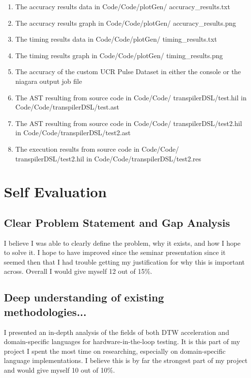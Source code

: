 \documentclass[sigconf,authordraft]{acmart}
\begin{document}
\begin{enumerate}
  \item The accuracy results data in Code/Code/plotGen/ accuracy\_results.txt
  \item The accuracy results graph in Code/Code/plotGen/ accuracy\_results.png
  \item The timing results data in Code/Code/plotGen/ timing\_results.txt
  \item The timing results graph in Code/Code/plotGen/ timing\_results.png
  \item The accuracy of the custom UCR Pulse Dataset in either the console or the niagara output job file
  \item The AST resulting from source code in Code/Code/ transpilerDSL/test.hil in Code/Code/transpilerDSL/test.ast
  \item The AST resulting from source code in Code/Code/ transpilerDSL/test2.hil in Code/Code/transpilerDSL/test2.ast
  \item The execution results from source code in Code/Code/ transpilerDSL/test2.hil in Code/Code/transpilerDSL/test2.res
\end{enumerate}

\section{Self Evaluation}

\subsection{Clear Problem Statement and Gap Analysis}
I believe I was able to clearly define the problem, why it exists, and how I hope to solve it. I hope to have improved since the seminar presentation since it seemed then that I had trouble getting my justification for why this is important across. Overall I would give myself 12 out of 15\%.

\subsection{Deep understanding of existing methodologies...}
I presented an in-depth analysis of the fields of both DTW acceleration and domain-specific languages for hardware-in-the-loop testing. It is this part of my project I spent the most time on researching, especially on domain-specific language implementations. I believe this is by far the strongest part of my project and would give myself 10 out of 10\%.
\end{document}
